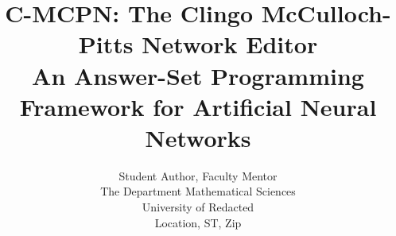 

\title{C-MCPN: The Clingo McCulloch-Pitts Network Editor\\
       \large An Answer-Set Programming Framework for Artificial Neural Networks}

\author{
Student Author\affmark[1], Faculty Mentor\affmark[2]\\
The Department Mathematical Sciences\\
University of Redacted\\
Location, ST, Zip\\
\affmark[1]\\
\affmark[2]\\
}
